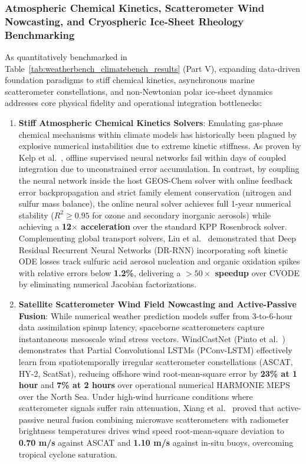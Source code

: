 \subsubsection{Atmospheric Chemical Kinetics, Scatterometer Wind Nowcasting, and Cryospheric Ice-Sheet Rheology Benchmarking}
As quantitatively benchmarked in Table~\ref{tab:weatherbench_climatebench_results} (Part V), expanding data-driven foundation paradigms to stiff chemical kinetics, asynchronous marine scatterometer constellations, and non-Newtonian polar ice-sheet dynamics addresses core physical fidelity and operational integration bottlenecks:
\begin{enumerate}
    \item \textbf{Stiff Atmospheric Chemical Kinetics Solvers}: Emulating gas-phase chemical mechanisms within climate models has historically been plagued by explosive numerical instabilities due to extreme kinetic stiffness. As proven by Kelp et al.~\cite{kelp2022online}, offline supervised neural networks fail within days of coupled integration due to unconstrained error accumulation. In contrast, by coupling the neural network inside the host GEOS-Chem solver with online feedback error backpropagation and strict family element conservation (nitrogen and sulfur mass balance), the online neural solver achieves full 1-year numerical stability ($R^2 \ge 0.95$ for ozone and secondary inorganic aerosols) while achieving a \textbf{12$\times$ acceleration} over the standard KPP Rosenbrock solver. Complementing global transport solvers, Liu et al.~\cite{liu2025atmospheric} demonstrated that Deep Residual Recurrent Neural Networks (DR-RNN) incorporating soft kinetic ODE losses track sulfuric acid aerosol nucleation and organic oxidation spikes with relative errors below \textbf{1.2\%}, delivering a \textbf{$>50\times$ speedup} over CVODE by eliminating numerical Jacobian factorizations.
    \item \textbf{Satellite Scatterometer Wind Field Nowcasting and Active-Passive Fusion}: While numerical weather prediction models suffer from 3-to-6-hour data assimilation spinup latency, spaceborne scatterometers capture instantaneous mesoscale wind stress vectors. WindCastNet (Pinto et al.~\cite{pinto2026windcastnet}) demonstrates that Partial Convolutional LSTMs (PConv-LSTM) effectively learn from spatiotemporally irregular scatterometer constellations (ASCAT, HY-2, ScatSat), reducing offshore wind root-mean-square error by \textbf{23\% at 1 hour} and \textbf{7\% at 2 hours} over operational numerical HARMONIE MEPS over the North Sea. Under high-wind hurricane conditions where scatterometer signals suffer rain attenuation, Xiang et al.~\cite{xiang2024scatterometer} proved that active-passive neural fusion combining microwave scatterometers with radiometer brightness temperatures drives wind speed root-mean-square deviation to \textbf{0.70 m/s} against ASCAT and \textbf{1.10 m/s} against in-situ buoys, overcoming tropical cyclone saturation.

\end{enumerate}
